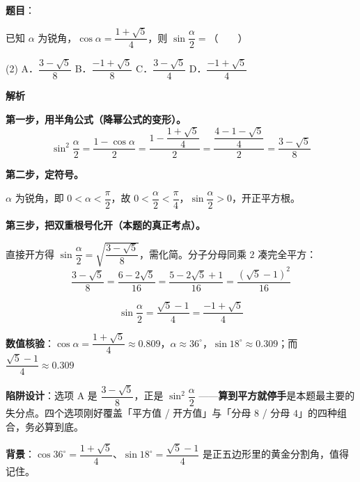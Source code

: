 \begin{answer}

\textbf{题目}：

已知 $\alpha$ 为锐角，$\cos\alpha=\dfrac{1+\sqrt5}4$，则 $\sin\dfrac\alpha2=$\mbox{（　　）}

\begin{gkopts}(2)
\task A．$\dfrac{3-\sqrt5}8$
\task B．$\dfrac{-1+\sqrt5}8$
\task C．$\dfrac{3-\sqrt5}4$
\task D．$\dfrac{-1+\sqrt5}4$
\end{gkopts}

\textbf{解析}

\textbf{第一步，用半角公式（降幂公式的变形）。}
\nopagebreak[4]
\[\sin^{2}\frac\alpha2=\frac{1-\cos\alpha}2=\frac{1-\dfrac{1+\sqrt5}4}2=\frac{\dfrac{4-1-\sqrt5}4}2=\frac{3-\sqrt5}8\]

\textbf{第二步，定符号。}

$\alpha$ 为锐角，即 $0<\alpha<\dfrac\pi2$，故 $0<\dfrac\alpha2<\dfrac\pi4$，$\sin\dfrac\alpha2>0$，开正平方根。

\textbf{第三步，把双重根号化开（本题的真正考点）。}

直接开方得 $\sin\dfrac\alpha2=\sqrt{\dfrac{3-\sqrt5}8}$，需化简。分子分母同乘 $2$ 凑完全平方：
\nopagebreak[4]
\[\frac{3-\sqrt5}8=\frac{6-2\sqrt5}{16}=\frac{5-2\sqrt5+1}{16}=\frac{\left(\sqrt5-1\right)^{2}}{16}\]

\nopagebreak[4]
\[\sin\frac\alpha2=\frac{\sqrt5-1}4=\frac{-1+\sqrt5}4\]

\textbf{数值核验}：$\cos\alpha=\dfrac{1+\sqrt5}4\approx0.809$，$\alpha\approx36^\circ$，$\sin18^\circ\approx0.309$；而 $\dfrac{\sqrt5-1}4\approx0.309$ 

\begin{gktip}
\textbf{陷阱设计}：选项 A 是 $\dfrac{3-\sqrt5}8$，正是 $\sin^{2}\dfrac\alpha2$ ——\textbf{算到平方就停手}是本题最主要的失分点。四个选项刚好覆盖「平方值 / 开方值」与「分母 $8$ / 分母 $4$」的四种组合，务必算到底。

\textbf{背景}：$\cos36^\circ=\dfrac{1+\sqrt5}4$、$\sin18^\circ=\dfrac{\sqrt5-1}4$ 是正五边形里的黄金分割角，值得记住。
\end{gktip}


\par\medskip

\end{answer}
